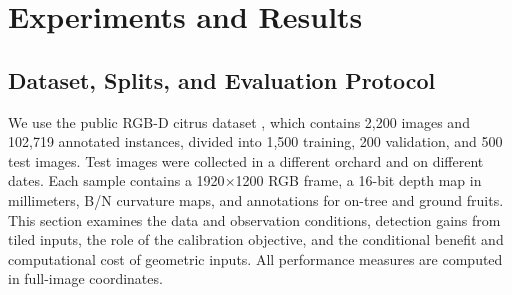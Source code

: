 \documentclass[11pt,a4paper]{article}
\begin{document}
\section{Experiments and Results}
\subsection{Dataset, Splits, and Evaluation Protocol}
We use the public RGB-D citrus dataset \cite{dataset,geosphere}, which contains 2,200 images and 102,719 annotated instances, divided into 1,500 training, 200 validation, and 500 test images. Test images were collected in a different orchard and on different dates. Each sample contains a 1920$\times$1200 RGB frame, a 16-bit depth map in millimeters, B/N curvature maps, and annotations for on-tree and ground fruits. This section examines the data and observation conditions, detection gains from tiled inputs, the role of the calibration objective, and the conditional benefit and computational cost of geometric inputs. All performance measures are computed in full-image coordinates.
\end{document}

